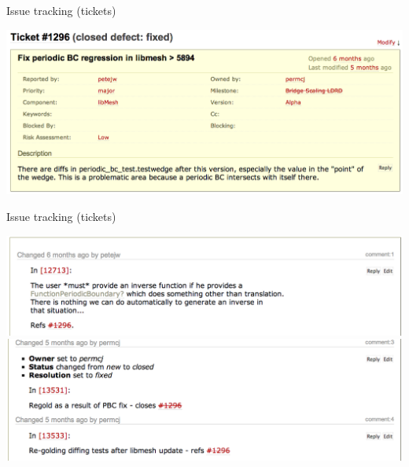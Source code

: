 \documentclass[mathserif]{beamer}
\begin{document}
\begin{frame}{Issue tracking (tickets)}
  \begin{center}
    \includegraphics[width=.95\textwidth]{ticket_1296_top}
  \end{center}
\end{frame}

\begin{frame}{Issue tracking (tickets)}
  \begin{center}
    \includegraphics[width=.95\textwidth]{ticket_1296_bot1}
    \\
    \includegraphics[width=.95\textwidth]{ticket_1296_bot2}
  \end{center}
\end{frame}
\end{document}
